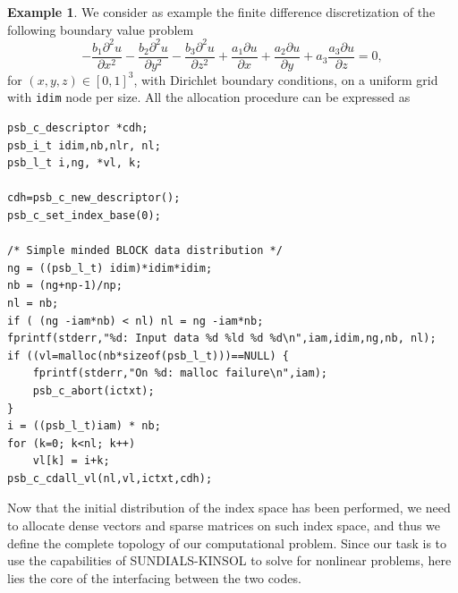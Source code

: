 \documentclass[twoside,a4paper]{refart}
\theoremstyle{definition}
\newtheorem{exmp}{Example}
\begin{document}
\begin{exmp}\label{ex:the_example}
We consider as example the finite difference discretization of the following boundary value problem
\begin{equation}\label{eq:boundaryproblem}
	- \frac{b_1 \partial^2 u}{\partial x^2} - \frac{b_2 \partial^2 u}{\partial y^2} - \frac{b_3 \partial^2 u}{\partial z^2} + \frac{a_1 \partial u}{\partial x} + \frac{a_2 \partial u}{\partial y} + a_3 \frac{a_3 \partial u}{\partial z} = 0,
\end{equation}
for $(x,y,z) \in [0,1]^3$, with Dirichlet boundary conditions, on a uniform grid with \lstinline[style=CStyle]|idim| node per size. All the allocation procedure can be expressed as
\begin{lstlisting}[style=CStyle,caption="Example of allocation procedure for a 3D block data distribution",label=lst:example_of_allocation]
psb_c_descriptor *cdh;
psb_i_t idim,nb,nlr, nl;
psb_l_t i,ng, *vl, k;

cdh=psb_c_new_descriptor();
psb_c_set_index_base(0);

/* Simple minded BLOCK data distribution */
ng = ((psb_l_t) idim)*idim*idim;
nb = (ng+np-1)/np;
nl = nb;
if ( (ng -iam*nb) < nl) nl = ng -iam*nb;
fprintf(stderr,"%d: Input data %d %ld %d %d\n",iam,idim,ng,nb, nl);
if ((vl=malloc(nb*sizeof(psb_l_t)))==NULL) {
	fprintf(stderr,"On %d: malloc failure\n",iam);
	psb_c_abort(ictxt);
}
i = ((psb_l_t)iam) * nb;
for (k=0; k<nl; k++)
	vl[k] = i+k;
psb_c_cdall_vl(nl,vl,ictxt,cdh);
\end{lstlisting}
\end{exmp}

	Now that the initial distribution of the index space has been performed, we need to allocate  dense vectors and sparse matrices on such index space, and thus we define the complete topology of our computational problem. Since our task is to use the capabilities of SUNDIALS-KINSOL to solve for nonlinear problems, here lies the core of the interfacing between the two codes.
\end{document}
